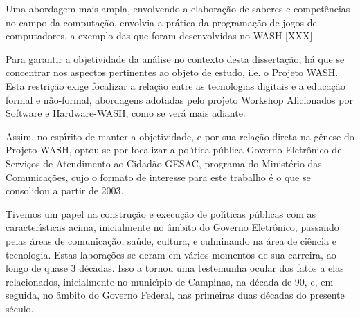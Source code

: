 \documentclass[
12pt,		%
openright,	%
twoside,  %
a4paper,			%
chapter=TITLE,		%
english,			%
french,				%
spanish,			%
brazil				%
]{USPSC-classe/USPSC}
\begin{document}
Uma abordagem mais ampla, envolvendo a elabora\c{c}\~ao de saberes e compet\^encias no campo da computa\c{c}\~ao, envolvia a pr\'atica da programa\c{c}\~ao de jogos de computadores, a exemplo das que foram desenvolvidas no WASH [XXX]














Para garantir a objetividade da an\'alise no contexto desta disserta\c{c}\~ao, h\'a que se concentrar nos aspectos pertinentes ao objeto de estudo, i.e. o Projeto WASH. Esta restri\c{c}\~ao exige focalizar a rela\c{c}\~ao entre as tecnologias digitais e a educa\c{c}\~ao formal e n\~ao-formal, abordagens adotadas pelo projeto Workshop Aficionados por Software e Hardware-WASH, como se ver\'a mais adiante.














Assim, no esp\'{\i}rito de manter a objetividade, e por sua rela\c{c}\~ao direta na g\^enese do Projeto WASH, optou-se por focalizar a pol\'{\i}tica p\'ublica \textquotedbl Governo Eletr\^onico de Servi\c{c}os de Atendimento ao Cidad\~ao-GESAC, programa do  Minist\'erio das Comunica\c{c}\~oes, cujo o formato de interesse para este trabalho \'e o que se consolidou a partir de 2003.














Tivemos um papel na constru\c{c}\~ao e execu\c{c}\~ao de pol\'{\i}ticas p\'ublicas com as caracter\'{\i}sticas acima, inicialmente no \^ambito do Governo Eletr\^onico, passando pelas \'areas de comunica\c{c}\~ao, sa\'ude, cultura, e culminando na \'area de ci\^encia e tecnologia. Estas labora\c{c}\~oes  se deram em v\'arios momentos de sua carreira, ao longo de quase 3 d\'ecadas. Isso a tornou uma testemunha ocular dos fatos a elas relacionados, inicialmente no  munic\'{\i}pio de Campinas, na d\'ecada de 90, e, em seguida, no \^ambito do Governo Federal, nas primeiras duas d\'ecadas do presente s\'eculo.
\end{document}
